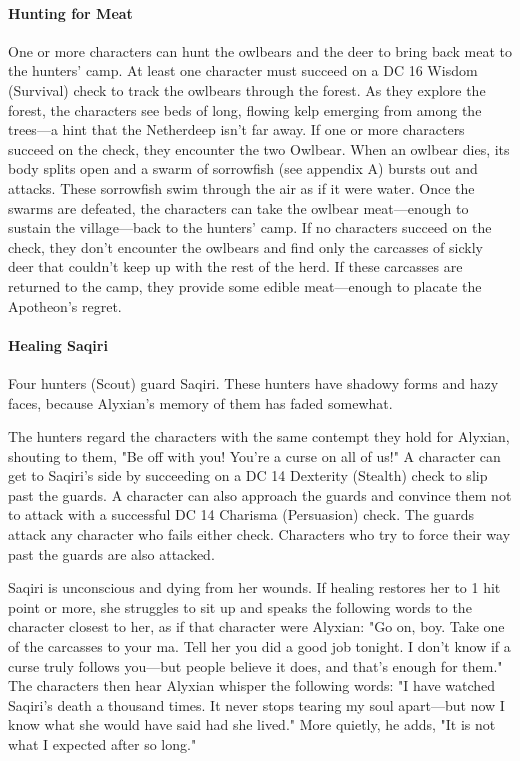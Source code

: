 \documentclass[10pt,a4paper,twoside,bg=print,twocolumn,openany,nodeprecatedcode]{dndbook}
\begin{document}
\paragraph{Hunting for Meat}
One or more characters can hunt the owlbears and the deer to bring back meat to the hunters' camp. At least one character must succeed on a DC 16 Wisdom (Survival) check to track the owlbears through the forest. As they explore the forest, the characters see beds of long, flowing kelp emerging from among the trees—a hint that the Netherdeep isn't far away. If one or more characters succeed on the check, they encounter the two Owlbear. When an owlbear dies, its body splits open and a swarm of sorrowfish (see appendix A) bursts out and attacks. These sorrowfish swim through the air as if it were water. Once the swarms are defeated, the characters can take the owlbear meat—enough to sustain the village—back to the hunters' camp. If no characters succeed on the check, they don't encounter the owlbears and find only the carcasses of sickly deer that couldn't keep up with the rest of the herd. If these carcasses are returned to the camp, they provide some edible meat—enough to placate the Apotheon's regret.

\paragraph{Healing Saqiri}
Four hunters (Scout) guard Saqiri. These hunters have shadowy forms and hazy faces, because Alyxian's memory of them has faded somewhat.

The hunters regard the characters with the same contempt they hold for Alyxian, shouting to them, "Be off with you! You're a curse on all of us!" A character can get to Saqiri's side by succeeding on a DC 14 Dexterity (Stealth) check to slip past the guards. A character can also approach the guards and convince them not to attack with a successful DC 14 Charisma (Persuasion) check. The guards attack any character who fails either check. Characters who try to force their way past the guards are also attacked.

Saqiri is unconscious and dying from her wounds. If healing restores her to 1 hit point or more, she struggles to sit up and speaks the following words to the character closest to her, as if that character were Alyxian: "Go on, boy. Take one of the carcasses to your ma. Tell her you did a good job tonight. I don't know if a curse truly follows you—but people believe it does, and that's enough for them." The characters then hear Alyxian whisper the following words: "I have watched Saqiri's death a thousand times. It never stops tearing my soul apart—but now I know what she would have said had she lived." More quietly, he adds, "It is not what I expected after so long."
\end{document}

